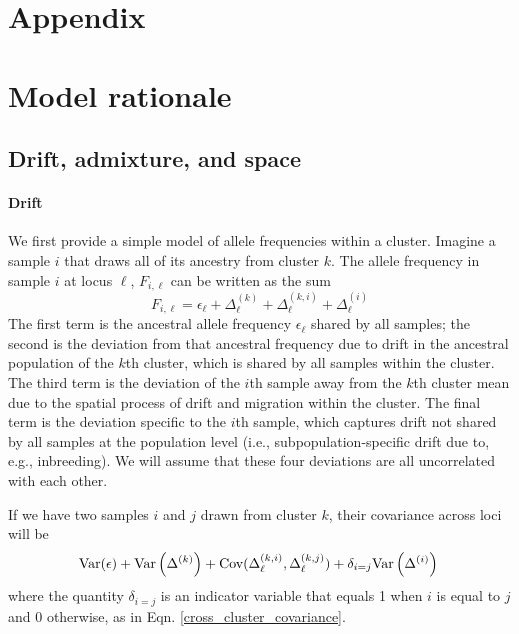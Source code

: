 \documentclass[12pt]{article}
\begin{document}
\newpage
\section*{Appendix}
\renewcommand{\theequation}{A\arabic{equation}}
\setcounter{equation}{0}
\renewcommand{\thetable}{A\arabic{table}}
\setcounter{table}{0}
\renewcommand{\thefigure}{A\arabic{figure}}
\setcounter{figure}{0}
\renewcommand{\thesection}{A\arabic{section}}
\setcounter{section}{0}


\section{Model rationale}
\subsection{Drift, admixture, and space}
\paragraph{Drift} 
We first provide a simple model of allele frequencies within a cluster. 
Imagine a sample $i$ that draws all of its ancestry from cluster $k$.
The allele frequency in sample $i$ at locus $\ell$, $F_{i,\ell}$ can be
written as the sum
\begin{equation}
F_{i,\ell} = \epsilon_{\ell} + \Delta^{(k)}_{\ell} +
\Delta^{(k,i)}_{\ell} + \Delta^{(i)}_{\ell}
\label{drift_terms_no_admix}
\end{equation}
The first term is the ancestral allele frequency $\epsilon_\ell$ shared by all samples; 
the second is the deviation from that ancestral frequency 
due to drift in the ancestral population of the $k$th cluster,
which is shared by all samples within the cluster. 
The third term is the deviation of the $i$th sample away from the $k$th cluster mean 
due to the spatial process of drift and migration within the cluster.
The final term is the deviation specific to the $i$th sample,
which captures drift not shared by all samples at the population level
(i.e., subpopulation-specific drift due to, e.g., inbreeding). 
We will assume that these four deviations are all uncorrelated with each other.

If we have two samples $i$ and $j$ drawn from cluster $k$, 
their covariance across loci will be 
\begin{equation}
\text{Var}(\epsilon) +  \text{Var}\left( \Delta^{(k)} \right) +
\text{Cov}(\Delta^{(k,i)}_{\ell},\Delta^{(k,j)}_{\ell}) + \delta_{i=j} \text{Var}\left( \Delta^{(i)} \right)\ \\
\end{equation}
where the quantity $\delta_{i=j}$ is an indicator variable that equals 1 when $i$ is equal to $j$ and 0 otherwise, 
as in Eqn. \eqref{cross_cluster_covariance}.
\end{document}
